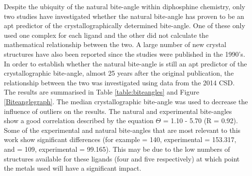 Despite the ubiquity of the natural bite-angle within diphosphine chemistry, only two studies have investigated whether the natural bite-angle has proven to be an apt predictor of the crystallographically determined bite-angle.\cite{Casey1990, Dierkes1999}  One of these only used one complex for each ligand and the other did not calculate the mathematical relationship between the two.  A large number of new crystal structures have also been reported since the studies were published in the 1990's.\cite{Allen2002}  In order to establish whether the natural bite-angle is still an apt predictor of the crystallographic bite-angle, almost 25 years after the original publication, the relationship between the two was investigated using data from the 2014 \gls{CSD}.\cite{Allen2002}  The results are summarised in Table \ref{table:biteangles} and Figure \ref{Biteanglegraph}.  The median crystallographic bite-angle was used to decrease the influence of outliers on the results.  The natural and experimental bite-angles show a good correlation described by the equation $\Theta$ = 1.10 \natbiteangle - 5.70 (R = 0.92).  Some of the experimental and natural bite-angles that are most relevant to this work show significant differences (for example \tBuxantphos{} \natbiteangle{} = 140\degrees, experimental = 153.317\degrees{}, and \Phsixantphos{} \natbiteangle{} = 109\degrees{}, experimental = 99.165\degrees).  This may be due to the low numbers of structures available for these ligands (four and five respectively) at which point the metals used will have a significant impact. 

